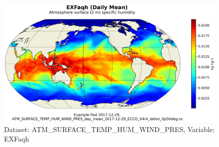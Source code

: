 \begin{figure}[H]
\centering
\includegraphics[scale=0.55]{../images/plots/latlon_plots/Atmosphere_Surface_Temperature_Humidity_Wind_and_Pressure/EXFaqh.png}
\caption{Dataset: ATM\_SURFACE\_TEMP\_HUM\_WIND\_PRES, Variable: EXFaqh}
\label{tab:table-ATM_SURFACE_TEMP_HUM_WIND_PRES_EXFaqh-Plot}
\end{figure}
\pagebreak
